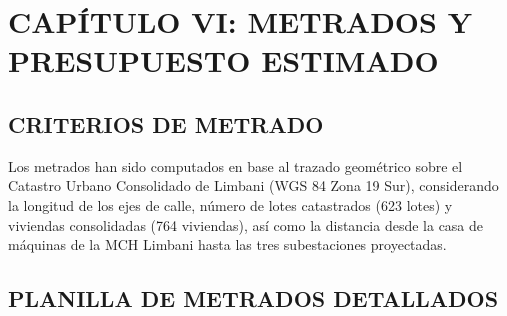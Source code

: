 \chapter*{CAPÍTULO VI: METRADOS Y PRESUPUESTO ESTIMADO}

\section{CRITERIOS DE METRADO}

Los metrados han sido computados en base al trazado geométrico sobre el Catastro Urbano Consolidado de Limbani (WGS 84 Zona 19 Sur), considerando la longitud de los ejes de calle, número de lotes catastrados (623 lotes) y viviendas consolidadas (764 viviendas), así como la distancia desde la casa de máquinas de la MCH Limbani hasta las tres subestaciones proyectadas.

\section{PLANILLA DE METRADOS DETALLADOS}

